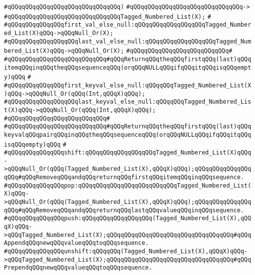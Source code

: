 \verb|#qQQqqQQqqQQqqQQqqQQqqQQqqQQqqQQq)|\newline
\verb|#qQQqqQQqqQQqqQQqqQQqqQQqqQQqqQQq->|\newline
\verb|#qQQqqQQqqQQqqQQqqQQqqQQqqQQqqQQqTagged_Numbered_List(X);|\newline
\verb|#|\newline
\verb|#qQQqqQQqqQQqqQQqfirst_val_else_null:qQQqqQQqqQQqqQQqqQQqTagged_Numbered_List(X)qQQq->qQQqNull_Or(X);|\newline
\verb|#qQQqqQQqqQQqqQQqqQQqlast_val_else_null:qQQqqQQqqQQqqQQqqQQqTagged_Numbered_List(X)qQQq->qQQqNull_Or(X);|\newline
\verb|#qQQqqQQqqQQqqQQqqQQqqQQqqQQq#|\newline
\verb|#qQQqqQQqqQQqqQQqqQQqqQQqqQQq#qQQqReturnqQQqtheqQQqfirstqQQq(last)qQQqitemqQQqinqQQqtheqQQqsequenceqQQq(orqQQqNULLqQQqifqQQqitqQQqisqQQqempty)qQQq|\newline
\verb|#|\newline
\verb|#qQQqqQQqqQQqqQQqfirst_keyval_else_null:qQQqqQQqTagged_Numbered_List(X)qQQq->qQQqNull_Or(qQQq(Int,qQQqX)qQQq);|\newline
\verb|#qQQqqQQqqQQqqQQqqQQqlast_keyval_else_null:qQQqqQQqTagged_Numbered_List(X)qQQq->qQQqNull_Or(qQQq(Int,qQQqX)qQQq);|\newline
\verb|#qQQqqQQqqQQqqQQqqQQqqQQqqQQq#|\newline
\verb|#qQQqqQQqqQQqqQQqqQQqqQQqqQQq#qQQqReturnqQQqtheqQQqfirstqQQq(last)qQQqkeyvalqQQqpairqQQqinqQQqtheqQQqsequenceqQQq(orqQQqNULLqQQqifqQQqitqQQqisqQQqempty)qQQq|\newline
\verb|#|\newline
\verb|#qQQqqQQqqQQqqQQqshift:qQQqqQQqqQQqqQQqqQQqTagged_Numbered_List(X)qQQq->qQQqNull_Or(qQQq(Tagged_Numbered_List(X),qQQqX)qQQq);qQQqqQQqqQQqqQQqqQQq#qQQqRemoveqQQqandqQQqreturnqQQqfirstqQQqitemqQQqinqQQqsequence.|\newline
\verb|#qQQqqQQqqQQqqQQqpop:qQQqqQQqqQQqqQQqqQQqqQQqqQQqTagged_Numbered_List(X)qQQq->qQQqNull_Or(qQQq(Tagged_Numbered_List(X),qQQqX)qQQq);qQQqqQQqqQQqqQQqqQQq#qQQqRemoveqQQqandqQQqreturnqQQqlastqQQqvalueqQQqinqQQqsequence.|\newline
\verb|#qQQqqQQqqQQqqQQqpush:qQQqqQQqqQQqqQQqqQQq(Tagged_Numbered_List(X),qQQqX)qQQq->qQQqTagged_Numbered_List(X);qQQqqQQqqQQqqQQqqQQqqQQqqQQqqQQqqQQq#qQQqAppendqQQqnewqQQqvalueqQQqtoqQQqsequence.|\newline
\verb|#qQQqqQQqqQQqqQQqunshift:qQQqqQQq(Tagged_Numbered_List(X),qQQqX)qQQq->qQQqTagged_Numbered_List(X);qQQqqQQqqQQqqQQqqQQqqQQqqQQqqQQqqQQq#qQQqPrependqQQqnewqQQqvalueqQQqtoqQQqsequence.|\newline
